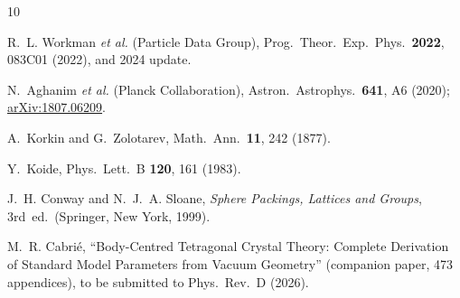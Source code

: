 \documentclass[aps,prl,reprint,superscriptaddress,showpacs]{revtex4-2}
\begin{document}
\begin{thebibliography}{10}

R.~L. Workman \textit{et al.} (Particle Data Group),
Prog.\ Theor.\ Exp.\ Phys.\ \textbf{2022}, 083C01 (2022),
and 2024 update.

N.~Aghanim \textit{et al.} (Planck Collaboration),
Astron.\ Astrophys.\ \textbf{641}, A6 (2020);
\href{https://arxiv.org/abs/1807.06209}{arXiv:1807.06209}.

A.~Korkin and G.~Zolotarev,
Math.\ Ann.\ \textbf{11}, 242 (1877).

Y.~Koide,
Phys.\ Lett.\ B \textbf{120}, 161 (1983).

J.~H. Conway and N.~J.~A. Sloane,
\textit{Sphere Packings, Lattices and Groups},
3rd~ed.\ (Springer, New York, 1999).

M.~R. Cabri\'{e},
``Body-Centred Tetragonal Crystal Theory: Complete Derivation
of Standard Model Parameters from Vacuum Geometry'' (companion paper,
473 appendices), to be submitted to Phys.\ Rev.\ D (2026).

\end{thebibliography}
\end{document}
